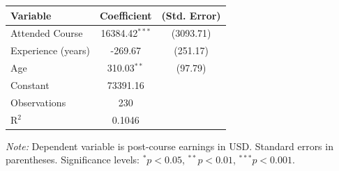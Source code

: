 \begin{tabular}{lcc}
\hline\hline
Variable & Coefficient & (Std. Error) \\
\hline
Attended Course & 16384.42$^{***}$ & (3093.71) \\
Experience (years) & -269.67 & (251.17) \\
Age & 310.03$^{**}$ & (97.79) \\
Constant & 73391.16 & \\
\hline
Observations & 230 & \\
R$^2$ & 0.1046 & \\
\hline\hline
\end{tabular}

\vspace{0.3em}

\textit{Note:} Dependent variable is post-course earnings in USD. Standard errors in parentheses.
Significance levels: $^{*}p<0.05$, $^{**}p<0.01$, $^{***}p<0.001$.